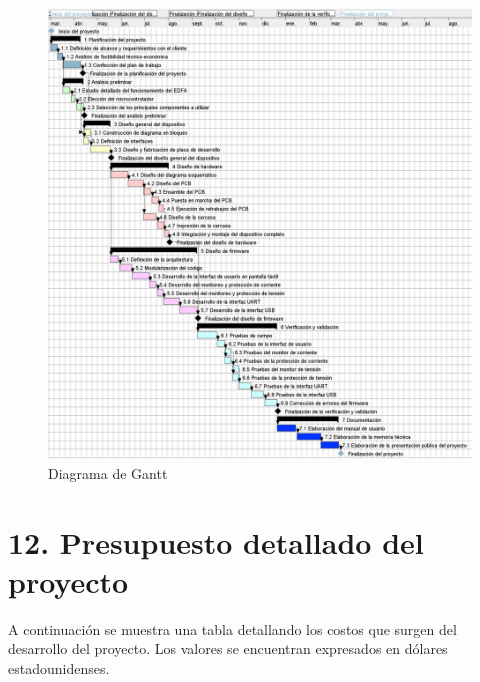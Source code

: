 \documentclass[
11pt, %
]{charter}
\begin{document}
\begin{figure}[htpb]
\centering 
\includegraphics[height=.7\textheight]{./Figuras/Gantt_Diag.png}
\caption{Diagrama de Gantt}
\label{fig:Gantt_Diag}
\end{figure}

\section{12. Presupuesto detallado del proyecto}
\label{sec:presupuesto}

A continuación se muestra una tabla detallando los costos que surgen del desarrollo del proyecto. Los valores se encuentran expresados en dólares estadounidenses.
\end{document}
